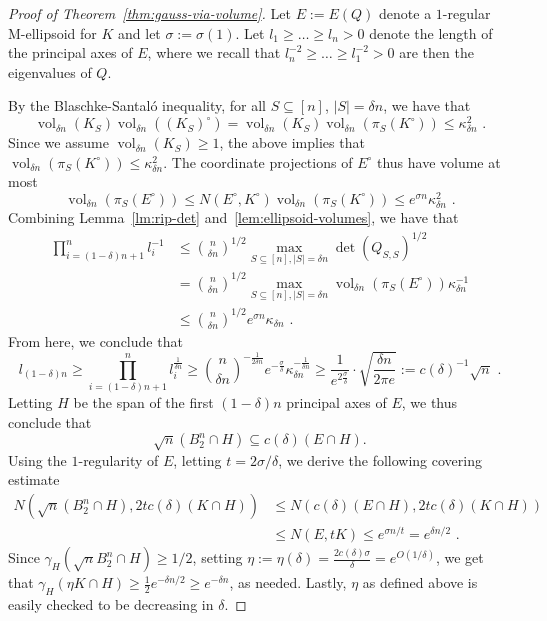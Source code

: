\documentclass[11pt]{article}
\DeclareMathOperator{\vol}{vol}
\begin{document}
\begin{proof}[Proof of Theorem~\ref{thm:gauss-via-volume}]
Let $E := E(Q)$ denote a $1$-regular M-ellipsoid for $K$ and let $\sigma :=
\sigma(1)$. Let $l_1 \geq \dots \geq l_n > 0$ denote
the length of the principal axes of $E$, where we recall that
$l_n^{-2}\geq \dots \geq l_1^{-2} > 0$ are then the eigenvalues of $Q$.

By the Blaschke-Santal{\'o} inequality, for all $S \subseteq
[n]$, $|S|=\delta n$, we have that 
\[
\vol_{\delta n}(K_S)\vol_{\delta n}((K_S)^\circ) = 
\vol_{\delta n}(K_S) \vol_{\delta n}(\pi_S(K^\circ)) \leq
\kappa_{\delta n}^2 \text{ .}
\]
Since we assume $\vol_{\delta n}(K_S) \geq 1$, the above implies that
$\vol_{\delta n}(\pi_S(K^\circ)) \leq \kappa_{\delta n}^2$. The
coordinate projections of $E^\circ$ thus have volume at most 
\[
\vol_{\delta n}(\pi_S(E^\circ)) \leq N(E^\circ,K^\circ)
\vol_{ \delta n}(\pi_S(K^\circ)) \leq e^{\sigma n} \kappa_{\delta n}^2 \text{ .}
\]
Combining Lemma~\ref{lm:rip-det} and~\ref{lem:ellipsoid-volumes}, we have that
\begin{align*}
\prod_{i=(1-\delta)n+1}^n l_i^{-1} &\leq \binom{n}{\delta n}^{1/2} \max_{S \subseteq
[n],|S|=\delta n} \det(Q_{S,S})^{1/2} \\
&= \binom{n}{\delta n}^{1/2} \max_{S \subseteq [n],|S|=\delta n}
\vol_{\delta n}(\pi_S(E^\circ)) \kappa_{\delta n}^{-1} \\
&\leq \binom{n}{\delta n}^{1/2} e^{\sigma n} \kappa_{\delta n} \text{ .}
\end{align*}
From here, we conclude that 
\begin{equation}
\label{eq:axis-long}
l_{(1-\delta)n} \geq \prod_{i=(1-\delta)n+1}^n l_i^{\frac{1}{\delta
n}} \geq \binom{n}{\delta 
n}^{-\frac{1}{2\delta n}} e^{-\frac{\sigma}{\delta }} \kappa_{\delta
n}^{-\frac{1}{\delta n}} \geq 
\frac{1}{e^{2\frac{\sigma}{\delta }}} \cdot \sqrt{\frac{\delta n}{2\pi e}} :=
c(\delta)^{-1} \sqrt{n} \text{ .}
\end{equation}
Letting $H$ be the span of the first $(1-\delta)n$ principal
axes of $E$, we thus conclude that 
\[
\sqrt{n} (B_2^n \cap H) \subseteq c(\delta) (E \cap H). 
\]
Using the $1$-regularity of $E$, letting $t = 2 \sigma / \delta$, we derive the
following covering estimate 
\begin{align*}
N(\sqrt{n} (B_2^n \cap H), 2 t c(\delta) (K \cap H))
&\leq N(c(\delta)(E \cap H), 2 t c(\delta) (K \cap H)) \\
&\leq N(E, t K) \leq e^{\sigma n / t} = e^{\delta n/2} \text{ .}
\end{align*}
Since $\gamma_H(\sqrt{n} B_2^n \cap H) \geq 1/2$, setting $\eta := \eta(\delta)
=\frac{2c(\delta)\sigma}{\delta} = e^{O(1/\delta)}$, we get that $\gamma_H(\eta K
\cap H) \geq \frac{1}{2} e^{-\delta n/2} \geq e^{-\delta n}$, as needed. Lastly,
$\eta$ as defined above is easily checked to be decreasing in $\delta$.
\end{proof}
\end{document}
